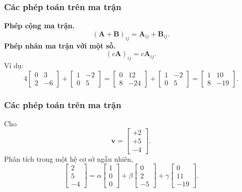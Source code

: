 \begin{frame}
    \frametitle{Các phép toán trên ma trận}
    \textbf{Phép cộng ma trận.} \[(\mathbf{A}+\mathbf{B})_{ij}=\mathbf{A}_{ij}+\mathbf{B}_{ij}.\]
    \textbf{Phép nhân ma trận với một số.}\[(c\mathbf{A})_{ij}=c\mathbf{A}_{ij}.\]
    Ví dụ: \[4\begin{bmatrix}
    0&3\\ 2&-6
\end{bmatrix}+\begin{bmatrix}
    1&-2\\ 0&5
\end{bmatrix}=\begin{bmatrix}
    0&12\\ 8&-24
\end{bmatrix}+\begin{bmatrix}
    1&-2\\ 0&5
\end{bmatrix}=\begin{bmatrix}
    1&10\\ 8&-19
\end{bmatrix}.\]
\end{frame}
\begin{frame}
    \frametitle{Các phép toán trên ma trận}
    Cho \[\mathbf{v}=\begin{bmatrix}
    +2\\+5\\-4
\end{bmatrix}.\] Phân tích trong một hệ cơ sở ngẫu nhiên,
\[\begin{bmatrix}
    2\\5\\-4
\end{bmatrix}=\alpha\begin{bmatrix}
    1\\0\\0
\end{bmatrix}+\beta\begin{bmatrix}
    0\\2\\-5
\end{bmatrix}+\gamma\begin{bmatrix}
    0\\11\\-19
\end{bmatrix}.\]
\end{frame}
